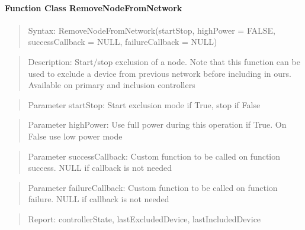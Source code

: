 \paragraph{Function Class RemoveNodeFromNetwork}
\begin{quote}Syntax: RemoveNodeFromNetwork(startStop, highPower = FALSE, successCallback = NULL, failureCallback = NULL)\end{quote}
\begin{quote}Description: Start/stop exclusion of a node. Note that this function can be used to exclude a device from previous network before including in ours. Available on primary and inclusion controllers\end{quote}
\begin{quote}Parameter startStop: Start exclusion mode if True, stop if False\end{quote}
\begin{quote}Parameter highPower: Use full power during this operation if True. On False use low power mode\end{quote}
\begin{quote}Parameter successCallback: Custom function to be called on function success. NULL if callback is not needed\end{quote}
\begin{quote}Parameter failureCallback: Custom function to be called on function failure. NULL if callback is not needed\end{quote}
\begin{quote}Report: controllerState, lastExcludedDevice, lastIncludedDevice\end{quote}

